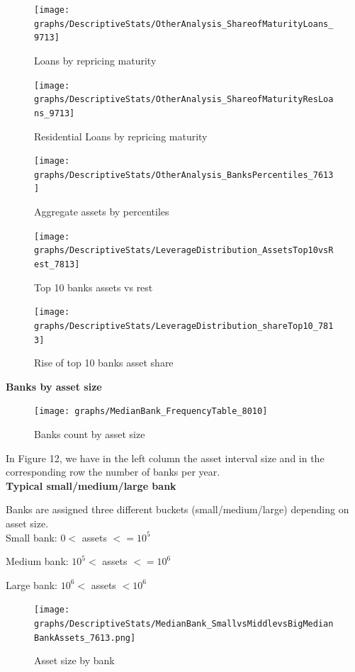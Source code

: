 \documentclass[12pt, a4paper]{article} %
\begin{document}
\begin{figure}[hbtp]
\centering
\caption{Loans by repricing maturity}
\texttt{[image: graphs/DescriptiveStats/OtherAnalysis\_ShareofMaturityLoans\_9713]}
\end{figure}


\begin{figure}[hbtp]
\centering
\caption{Residential Loans by repricing maturity}
\texttt{[image: graphs/DescriptiveStats/OtherAnalysis\_ShareofMaturityResLoans\_9713]}
\end{figure}


\begin{figure}[hbtp]
\centering
\caption{Aggregate assets by percentiles}
\texttt{[image: graphs/DescriptiveStats/OtherAnalysis\_BanksPercentiles\_7613]}
\end{figure}

\begin{figure}[hbtp]
\centering
\caption{Top 10 banks assets vs rest}
\texttt{[image: graphs/DescriptiveStats/LeverageDistribution\_AssetsTop10vsRest\_7813]}
\end{figure}


\begin{figure}[hbtp]
\centering
\caption{Rise of top 10 banks asset share}
\texttt{[image: graphs/DescriptiveStats/LeverageDistribution\_shareTop10\_7813]}
\end{figure}

\textbf{Banks by asset size}

\begin{figure}[hbtp]
\centering
\caption{Banks count by asset size}
\texttt{[image: graphs/MedianBank\_FrequencyTable\_8010]}
\end{figure}

In Figure 12, we have in the left column the asset interval size and in the corresponding row the number of banks per year.\\

\textbf{Typical small/medium/large bank}

Banks are assigned three different buckets (small/medium/large) depending on asset size.\\

Small bank: $0<$ assets $<= 10^5$

Medium bank: $10^5<$ assets $<= 10^6$

Large bank: $10^6<$ assets $< 10^6$ 

\begin{figure}[hbtp]
\centering
\caption{Asset size by bank}
\texttt{[image: graphs/DescriptiveStats/MedianBank\_SmallvsMiddlevsBigMedianBankAssets\_7613.png]}
\end{figure}
\end{document}
